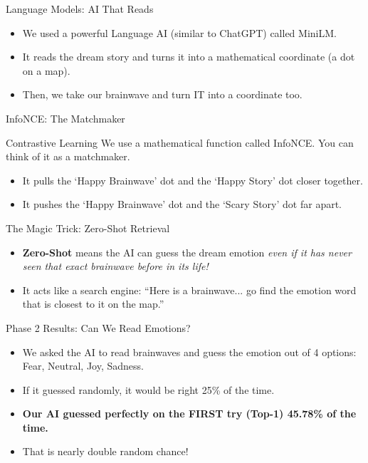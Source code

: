\documentclass[11pt, aspectratio=169]{beamer}
\begin{document}
\begin{frame}{Language Models: AI That Reads}
    \begin{itemize}
        \item We used a powerful Language AI (similar to ChatGPT) called MiniLM.
        \item It reads the dream story and turns it into a mathematical coordinate (a dot on a map).
        \item Then, we take our brainwave and turn IT into a coordinate too.
    \end{itemize}
\end{frame}

\begin{frame}{InfoNCE: The Matchmaker}
    \begin{block}{Contrastive Learning}
    We use a mathematical function called InfoNCE. You can think of it as a matchmaker.
    \end{block}
    \begin{itemize}
        \item It pulls the `Happy Brainwave' dot and the `Happy Story' dot closer together.
        \item It pushes the `Happy Brainwave' dot and the `Scary Story' dot far apart.
    \end{itemize}
\end{frame}

\begin{frame}{The Magic Trick: Zero-Shot Retrieval}
    \begin{itemize}
        \item \textbf{Zero-Shot} means the AI can guess the dream emotion \textit{even if it has never seen that exact brainwave before in its life!}
        \item It acts like a search engine: ``Here is a brainwave... go find the emotion word that is closest to it on the map.''
    \end{itemize}
\end{frame}

\begin{frame}{Phase 2 Results: Can We Read Emotions?}
    \begin{itemize}
        \item We asked the AI to read brainwaves and guess the emotion out of 4 options: Fear, Neutral, Joy, Sadness.
        \item If it guessed randomly, it would be right 25\% of the time.
        \item \textbf{Our AI guessed perfectly on the FIRST try (Top-1) 45.78\% of the time.}
        \item That is nearly double random chance!
    \end{itemize}
\end{frame}
\end{document}
